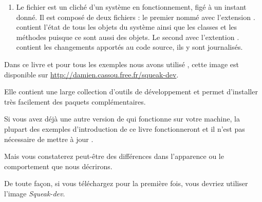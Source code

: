 \documentclass[a4paper,10pt,twoside]{book}
\begin{document}
\begin{enumerate}
\item Le fichier \emph{} est un cliché d'un système en fonctionnement, figé à un instant donné. 
Il est composé de deux fichiers : le premier nommé avec l'extension \emph{.} contient l'état de tous les objets du système ainsi que les classes et les méthodes puisque ce sont aussi des objets. Le second avec l'extention \emph{.} contient les changements apportés au code source, ils y sont journalisés.


\end{enumerate}



Dans ce livre et pour tous les exemples nous avons utilisé , cette image est disponible sur \url{http://damien.cassou.free.fr/squeak-dev}.
\label{sec:squeakDev}


Elle contient une large collection d'outils de développement et permet d'installer très facilement des paquets complémentaires.



Si vous avez déjà une autre version de \sq qui fonctionne sur votre machine, la plupart des exemples d'introduction de ce livre fonctionneront et il n'est pas nécessaire de mettre à jour \sq.


Mais vous constaterez peut-être des différences dans l'apparence ou le comportement que nous décrirons.


De toute façon, si vous téléchargez \sq pour la première fois, vous devriez utiliser l'image \emph{Squeak-dev}.
\end{document}
